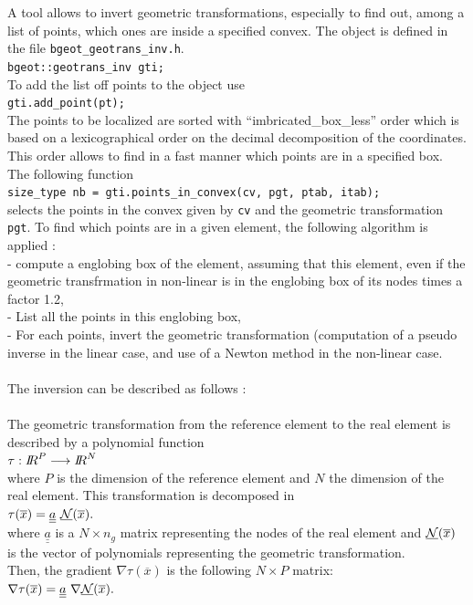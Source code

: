 \documentclass[11pt,a4paper]{article}
\begin{document}
A tool allows to invert geometric transformations, especially to find out, among a list of points, which ones are inside a specified convex. The object is defined in the file {\tt bgeot\_geotrans\_inv.h}.\\[0.5cm]
{\tt bgeot::geotrans\_inv gti; }\\[0.5cm]
To add the list off points to the object use\\[0.5cm]
{\tt gti.add\_point(pt);  }\\[0.5cm]
The points to be localized are sorted with ``imbricated\_box\_less'' order
which is based on a lexicographical order on the decimal
decomposition of the coordinates. This order allows to find in a 
fast manner which points are in a specified box. The following function \\[0.5cm]
{\tt size\_type nb = gti.points\_in\_convex(cv, pgt, ptab, itab); }\\[0.5cm]
selects the points in the convex given by {\tt cv} and the geometric transformation {\tt pgt}.  To find which points are in a given element, the following algorithm is applied : \\
- compute a englobing box of the element, assuming that this element,
even if the geometric transfrmation in non-linear is in the englobing
box of its nodes times a factor 1.2, \\
- List all the points in this englobing box, \\
- For each points, invert the geometric transformation (computation
of a pseudo inverse in the linear case, and use of a Newton method in
the non-linear case. \\ \\
The inversion can be described as follows : \\ \\
The geometric transformation from the reference element to the real
element is described by a polynomial function \\
$ \tau : {I\hspace{-0.3em}R}^P \longrightarrow {I\hspace{-0.3em}R}^N$ \\
where $P$ is the dimension of the reference element and $N$ the dimension
of the real element. This transformation is decomposed in \\
$ \tau(\overline{x}) = \underline{\underline{a}} \ 
\underline{\cal N}(\overline{x}). $ \\
where $\underline{\underline{a}}$ is a $N \times n_g$ matrix representing
the nodes of the real element and $\underline{\cal N}(\overline{x})$ is
the vector of polynomials representing the geometric transformation. \\
Then, the gradient $\nabla \tau(\overline{x})$ is the following
$N \times P$ matrix: \\
$ \nabla \tau(\overline{x}) = \underline{\underline{a}}\ \nabla
\underline{\cal N}(\overline{x}). $\\
\end{document}
